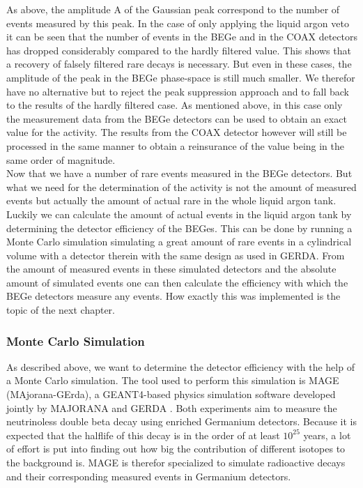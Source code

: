 As above, the amplitude A of the Gaussian peak correspond to the number of events measured by this peak.
In the case of only applying the liquid argon veto it can be seen that the number of events in the BEGe and in the COAX detectors has dropped considerably compared to the hardly filtered value.
This shows that a recovery of falsely filtered rare  decays is necessary.
But even in these cases, the amplitude of the peak in the BEGe phase-space is still much smaller.
We  therefor have no alternative but to reject the peak suppression approach and to fall back to the results of the hardly filtered case.
As mentioned above, in this case only the measurement data from the BEGe detectors can be used to obtain an exact value for the activity.
The results from the COAX detector however will still be processed in the same manner to obtain a reinsurance of the value being in the same order of magnitude.
\\

Now that we have a number of rare  events measured in the BEGe detectors.
But what we need for the determination of the activity is not the amount of measured events but actually the amount of actual rare  in the whole liquid argon tank.
Luckily we can calculate the amount of actual events in the liquid argon tank by determining the detector efficiency of the BEGes.
This can be done by running a Monte Carlo simulation simulating a great amount of rare  events in a cylindrical volume with a detector therein with the same design as used in GERDA.
From the amount of measured events in these simulated detectors and the absolute amount of simulated events one can then calculate the efficiency with which the BEGe detectors measure any  events. 
How exactly this was implemented is the topic of the next chapter.
\\

\subsubsection{Monte Carlo Simulation}
\label{sec:MonteCarlo514}

As described above, we want to determine the detector efficiency with the help of a Monte Carlo simulation.
The tool used to perform this simulation is MAGE (MAjorana-GErda), a GEANT4-based physics simulation software developed jointly by MAJORANA and GERDA \cite{boswell_melissa_chan_yuen-dat_detwiler_a._finnerty_padraic_henning_gehman_et}.
Both experiments aim to measure the neutrinoless double beta decay using enriched Germanium detectors.
Because it is expected that the halflife of this decay is in the order of at least \(10^{25}\) years, a lot of effort is put into finding out how big the contribution of different isotopes to the background is.
MAGE is therefor specialized to simulate radioactive decays and their corresponding measured events in Germanium detectors.
\\

